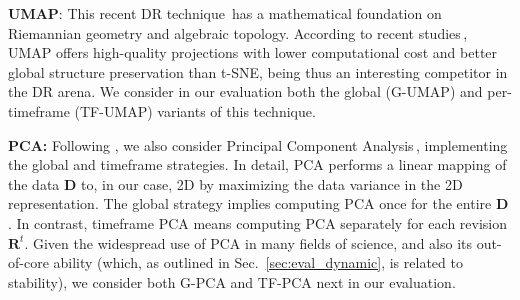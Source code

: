 \noindent\textbf{UMAP}: This recent DR technique\,\citep{umap} has a mathematical foundation on Riemannian geometry and algebraic topology. According to recent studies\,\citep{Espadoto19,Becht2019}, UMAP offers high-quality projections with lower computational cost and better global structure preservation than t-SNE, being thus an interesting competitor in the DR arena.  We consider in our evaluation both the global (G-UMAP) and per-timeframe (TF-UMAP) variants of this technique.


\noindent\textbf{PCA:} Following \citep{Fujiwara2019,Mao2007,Ward2011}, we also consider Principal Component Analysis\,\citep{pca}, implementing the global and timeframe strategies. In detail, PCA performs a linear mapping of the data $\mathbf{D}$ to, in our case, 2D by maximizing the data variance in the 2D representation. The global strategy implies computing PCA once for the entire $\mathbf{D}$. In contrast, timeframe PCA means computing PCA separately for each revision $\mathbf{R}^t$. Given the widespread use of PCA in many fields of science, and also its out-of-core ability (which, as outlined in Sec.~\ref{sec:eval_dynamic}, is related to stability), we consider both G-PCA and TF-PCA next in our evaluation.


